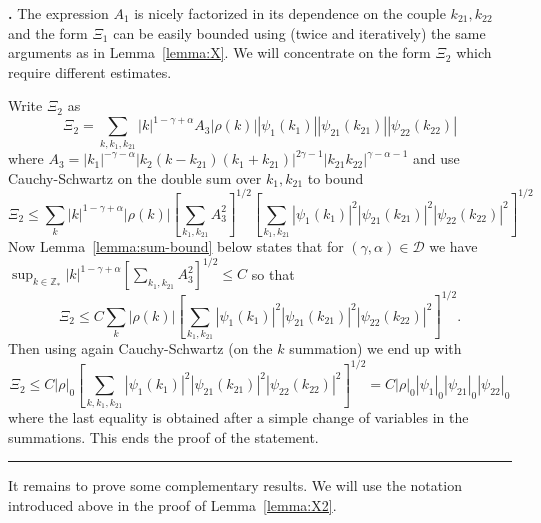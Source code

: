 \documentclass[a4paper,12pt,reqno]{article}
\newcommand{\DD}{\mathcal{D}}
\newcommand{\ZZ}{\mathbb{Z}}
\newenvironment{proof}[1][Proof]{\textbf{#1.} }{\ \rule{0.5em}{0.5em}}
\begin{document}
\begin{proof}[]
The expression $A_1$ is nicely factorized in its dependence on the
couple $k_{21},k_{22}$ and  the form $\Xi_1$ can be easily bounded
using (twice and iteratively) the same arguments as in
Lemma~\ref{lemma:X}.
We will concentrate on the form $\Xi_2$ which require  different
estimates. 

Write $\Xi_2$ as
$$
\Xi_2 = \sum_{k,k_1,k_{21}} |k|^{1-\gamma+\alpha} A_3
 |\rho(k)| |\psi_1(k_1)|   |\psi_{21}(k_{21})|  |\psi_{22}(k_{22})|  
$$
where
$
A_3 =    |k_1|^{-\gamma-\alpha}
|k_2(k-k_{21})(k_1+k_{21})|^{2\gamma-1} 
 |k_{21} k_{22}|^{\gamma-\alpha-1}
$
and use Cauchy-Schwartz on the double sum over $k_1,k_{21}$ to bound
$$
\Xi_2 \le \sum_{k} |k|^{1-\gamma+\alpha} 
 |\rho(k)|   
 \left[\sum_{k_1,k_{21}}A_3^2\right]^{1/2}
\left[\sum_{k_1,k_{21}} |\psi_1(k_1)|^2   |\psi_{21}(k_{21})|^2  |\psi_{22}(k_{22})|^2\right]^{1/2}
$$
Now Lemma~\ref{lemma:sum-bound} below states that for $(\gamma,\alpha) \in \DD$ we
have
$
\sup_{k\in\ZZ_*} |k|^{1-\gamma+\alpha} 
 [\sum_{k_1,k_{21}}A_3^2]^{1/2} \le C
$
so that
$$
\Xi_2 \le C \sum_{k}
 |\rho(k)|   
\left[\sum_{k_1,k_{21}} |\psi_1(k_1)|^2   |\psi_{21}(k_{21})|^2  |\psi_{22}(k_{22})|^2\right]^{1/2}.
$$
Then using again  Cauchy-Schwartz (on the $k$ summation) we end up with
$$
\Xi_2 \le C |\rho|_0
\left[\sum_{k,k_1,k_{21}} |\psi_1(k_1)|^2   |\psi_{21}(k_{21})|^2
  |\psi_{22}(k_{22})|^2\right]^{1/2} = C|\rho|_0 |\psi_1|_0
|\psi_{21}|_0 |\psi_{22}|_0
$$
where the last equality is obtained after a simple change of variables
in the summations. This ends the proof of the statement.
\end{proof}

\bigskip
It remains to prove some complementary results. We will use the
notation introduced above in the proof of Lemma~\ref{lemma:X2}.
\end{document}
